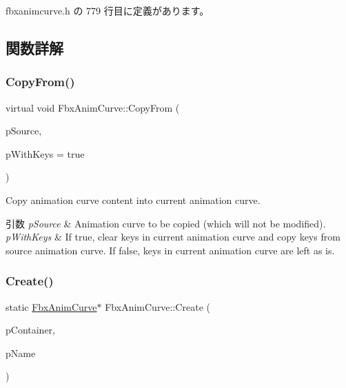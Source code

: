  fbxanimcurve.\+h の 779 行目に定義があります。



\subsection{関数詳解}
\mbox{\label{class_fbx_anim_curve_a8e5b647af7ed54b53189fd9488e12f77}} 
\subsubsection{\texorpdfstring{Copy\+From()}{CopyFrom()}}
{\footnotesize\ttfamily virtual void Fbx\+Anim\+Curve\+::\+Copy\+From (\begin{DoxyParamCaption}\item[{\hyperlink{class_fbx_anim_curve}{Fbx\+Anim\+Curve} \&}]{p\+Source,  }\item[{bool}]{p\+With\+Keys = {\ttfamily true} }\end{DoxyParamCaption})\hspace{0.3cm}{\ttfamily [pure virtual]}}

Copy animation curve content into current animation curve. 
\begin{DoxyParams}{引数}
{\em p\+Source} & Animation curve to be copied (which will not be modified). \\
\hline
{\em p\+With\+Keys} & If {\ttfamily true}, clear keys in current animation curve and copy keys from source animation curve. If {\ttfamily false}, keys in current animation curve are left as is. \\
\hline
\end{DoxyParams}
\mbox{\label{class_fbx_anim_curve_ab0faf2c8c4a3d0fa8535da4a3eacb74a}} 
\subsubsection{\texorpdfstring{Create()}{Create()}}
{\footnotesize\ttfamily static \hyperlink{class_fbx_anim_curve}{Fbx\+Anim\+Curve}$\ast$ Fbx\+Anim\+Curve\+::\+Create (\begin{DoxyParamCaption}\item[{\hyperlink{class_fbx_scene}{Fbx\+Scene} $\ast$}]{p\+Container,  }\item[{const char $\ast$}]{p\+Name }\end{DoxyParamCaption})\hspace{0.3cm}{\ttfamily [static]}}

